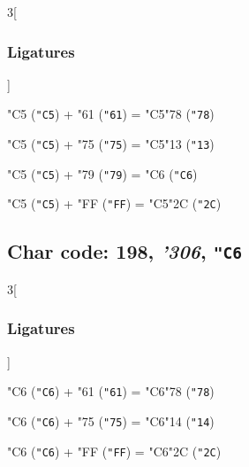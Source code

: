 \documentclass{article}
\newlength{\maxcharwidth}
\begin{document}
\begin{multicols}{3}[\subsubsection{Ligatures}]

{\testfont\char"C5\noboundary} ({\tt"C5}) + {\testfont\char"61\noboundary} ({\tt"61}) = {\testfont\char"C5\noboundary}{\testfont\char"78\noboundary} ({\tt"78}) 

{\testfont\char"C5\noboundary} ({\tt"C5}) + {\testfont\char"75\noboundary} ({\tt"75}) = {\testfont\char"C5\noboundary}{\testfont\char"13\noboundary} ({\tt"13}) 

{\testfont\char"C5\noboundary} ({\tt"C5}) + {\testfont\char"79\noboundary} ({\tt"79}) = {\testfont\char"C6\noboundary} ({\tt"C6}) 

{\testfont\char"C5\noboundary} ({\tt"C5}) + {\testfont\char"FF\noboundary} ({\tt"FF}) = {\testfont\char"C5\noboundary}{\testfont\char"2C\noboundary} ({\tt"2C}) 

\end{multicols}

\subsection{Char code: 198, {\it'306}, {\tt"C6}}
\label{char_198}


\begin{multicols}{3}[\subsubsection{Ligatures}]

{\testfont\char"C6\noboundary} ({\tt"C6}) + {\testfont\char"61\noboundary} ({\tt"61}) = {\testfont\char"C6\noboundary}{\testfont\char"78\noboundary} ({\tt"78}) 

{\testfont\char"C6\noboundary} ({\tt"C6}) + {\testfont\char"75\noboundary} ({\tt"75}) = {\testfont\char"C6\noboundary}{\testfont\char"14\noboundary} ({\tt"14}) 

{\testfont\char"C6\noboundary} ({\tt"C6}) + {\testfont\char"FF\noboundary} ({\tt"FF}) = {\testfont\char"C6\noboundary}{\testfont\char"2C\noboundary} ({\tt"2C}) 

\end{multicols}
\end{document}
